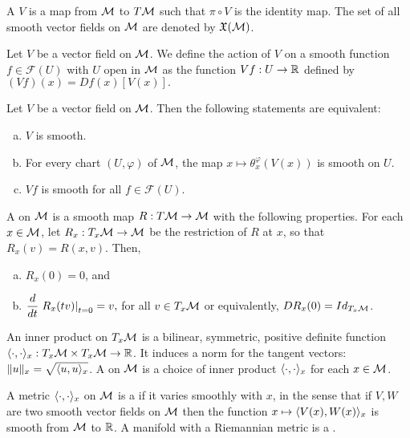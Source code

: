 \documentclass[11pt,a4paper]{article}
\begin{document}
\begin{definition}
A  $V$ is a map from $\mathcal{M}$ to $T\mathcal{M}$ such that $\pi\circ V$ is the identity map. The set of all smooth vector fields on $\mathcal{M}$ are denoted by $\mathfrak{X}(\mathcal{M})$.
\end{definition}

Let $V$ be a vector field on $\mathcal{M}$. We define the action of $V$ on a smooth function $f\in \mathcal{F}(U)$ with $U$ open in $\mathcal{M}$ as the function $Vf:U\rightarrow \mathbb{R}$ defined by $(Vf)(x) = Df(x)[V(x)].$

\begin{proposition}
Let $V$ be a vector field on $\mathcal{M}$. Then the following statements are equivalent:
\begin{enumerate}[(a)]
    \item $V$ is smooth.
    \item For every chart $(U,\varphi)$ of $\mathcal{M}$, the map $x\mapsto \theta_x^\varphi(V(x))$ is smooth on $U$.
    \item $Vf$ is smooth for all $f\in \mathcal{F}(U)$.
\end{enumerate}
\end{proposition}

\begin{definition}\label{def:retraction}
A  on $\mathcal{M}$ is a smooth map $R:T\mathcal{M}\rightarrow \mathcal{M}$ with the following properties. For each $x\in \mathcal{M}$, let $R_x:T_x\mathcal{M}\rightarrow \mathcal{M}$ be the restriction of $R$ at $x$, so that $R_x(v) = R(x,v)$. Then,
\begin{enumerate}[(a)]
    \item $R_x(0) = 0$, and
    \item $\dfrac{d}{dt}\left.R_x(tv)\right|_{t = 0} = v,$ for all $v\in T_x\mathcal{M}$ or equivalently, $DR_x(0) = Id_{T_x\mathcal{M}}$.
\end{enumerate}
\end{definition}

\begin{definition}
An inner product on $T_x\mathcal{M}$ is a bilinear, symmetric, positive definite function $\langle \cdot, \cdot \rangle_x:T_x\mathcal{M}\times T_x\mathcal{M}\rightarrow \mathbb{R}$. It induces a norm for the tangent vectors: $\|u\|_x = \sqrt{\langle u, u \rangle_x}$. A  on $\mathcal{M}$ is a choice of inner product $\langle \cdot, \cdot \rangle_x$ for each $x\in \mathcal{M}$. 
\end{definition}

\begin{definition}
A metric $\langle \cdot, \cdot \rangle_x$ on $\mathcal{M}$ is a  if it varies smoothly with $x$, in the sense that if $V,W$ are two smooth vector fields on $\mathcal{M}$ then the function $x\mapsto \langle V(x), W(x) \rangle_x$ is smooth from $\mathcal{M}$ to $\mathbb{R}$. A manifold with a Riemannian metric is a .
\end{definition}
\end{document}

